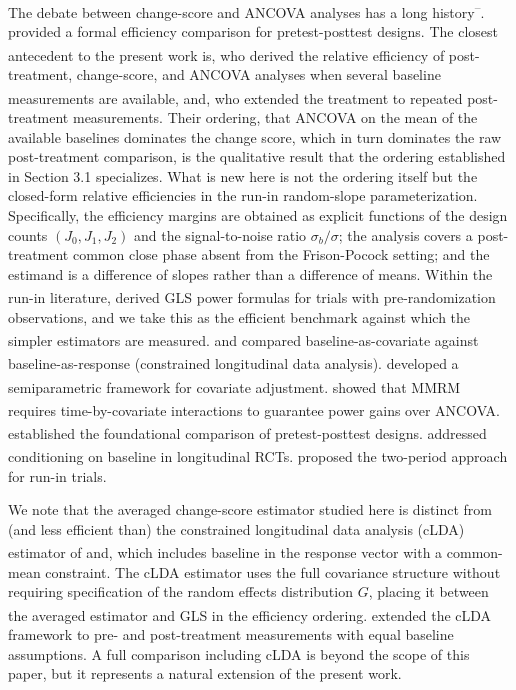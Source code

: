 \documentclass[
  11pt,
]{article}
\begin{document}
The debate between change-score and ANCOVA analyses has
a long history\textsuperscript{--}.\textsuperscript{} provided a formal efficiency
comparison for pretest-posttest designs. The closest
antecedent to the present work is\textsuperscript{}, who
derived the relative efficiency of post-treatment,
change-score, and ANCOVA analyses when several baseline
measurements are available, and\textsuperscript{}, who
extended the treatment to repeated post-treatment
measurements. Their ordering, that ANCOVA on the mean of
the available baselines dominates the change score,
which in turn dominates the raw post-treatment
comparison, is the qualitative result that the ordering
established in Section 3.1 specializes. What is new
here is not the ordering itself but the closed-form
relative efficiencies in the run-in random-slope
parameterization. Specifically, the efficiency margins
are obtained as explicit functions of the design counts
\((J_0, J_1, J_2)\) and the signal-to-noise ratio
\(\sigma_b/\sigma\); the analysis covers a post-treatment
common close phase absent from the Frison-Pocock
setting; and the estimand is a difference of slopes
rather than a difference of means. Within the run-in
literature,\textsuperscript{} derived GLS power formulas for
trials with pre-randomization observations, and we take
this as the efficient benchmark against which the
simpler estimators are measured.\textsuperscript{} and\textsuperscript{}
compared baseline-as-covariate against
baseline-as-response (constrained longitudinal data
analysis).\textsuperscript{} developed a semiparametric
framework for covariate adjustment.\textsuperscript{}
showed that MMRM requires time-by-covariate interactions
to guarantee power gains over ANCOVA.\textsuperscript{}
established the foundational comparison of
pretest-posttest designs.\textsuperscript{} addressed
conditioning on baseline in longitudinal RCTs.\textsuperscript{}
proposed the two-period approach for run-in trials.

We note that the averaged change-score estimator
studied here is distinct from (and less efficient than)
the constrained longitudinal data analysis (cLDA)
estimator of\textsuperscript{} and\textsuperscript{}, which includes
baseline in the response vector with a common-mean
constraint. The cLDA estimator uses the full covariance
structure without requiring specification of the random
effects distribution \(G\), placing it between the
averaged estimator and GLS in the efficiency ordering.\textsuperscript{} extended the cLDA framework to pre-
and post-treatment measurements with equal baseline
assumptions. A full comparison including cLDA is beyond
the scope of this paper, but it represents a natural
extension of the present work.
\end{document}
